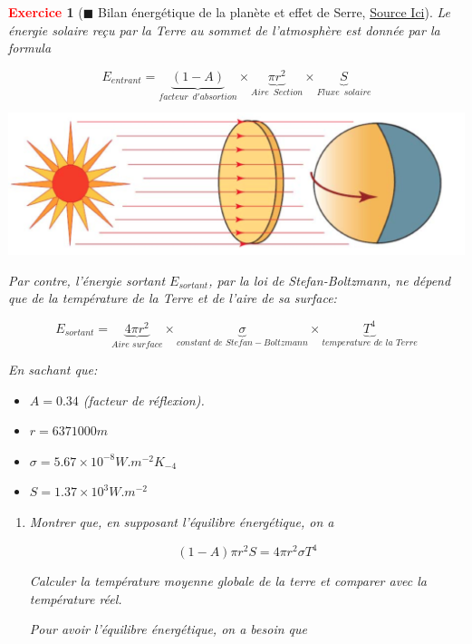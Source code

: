 \documentclass[11pt]{article}
\theoremstyle{mythmstyle}
\newtheorem{exo}{\textcolor{red}{\textbf{Exercice}}}
\begin{document}
\begin{exo}[$\blacksquare$ Bilan énergétique de la planète et effet de Serre, \href{http://step.ipgp.fr/images/e/ec/Bernard_geodynext_td1_corr.pdf}{Source Ici}]
Le énergie solaire reçu  par la Terre au sommet de l'atmosphère est donnée par la formula


$$E_{entrant}= \underbrace{(1-A)}_{facteur \,\,\,d'absortion}\times \underbrace{\pi r^2}_{Aire \,\,\,Section}\times \underbrace{S}_{Fluxe\,\,\, solaire}$$



\begin{center}
    \includegraphics[scale=0.4]{energyin.png}
\end{center}

Par contre, l'énergie sortant $E_{sortant}$, par la loi de Stefan-Boltzmann, ne dépend que de la température de la Terre et de l'aire de sa surface:

$$E_{sortant}= \underbrace{4\pi r^2}_{Aire \,\,surface }\times \underbrace{\sigma}_{constant\,\, de\,\, Stefan-Boltzmann}\times \underbrace{T^4}_{temperature\,\,de\,\,la\,\, Terre}$$

En sachant que:
\begin{itemize}
    \item $A=0.34$ (facteur de réflexion).
    \item $r= 6 371 000 m$
    \item $\sigma=5.67\times 10^{-8} W.m^{-2} K_{-4}$
    \item $S=1.37\times 10^3 W.m^{-2}$
\end{itemize}

\begin{enumerate}
\item Montrer que, en supposant l'équilibre énergétique, on a

$$
(1-A)\pi r^2 S= 4\pi r^2 \sigma T^4
$$

Calculer la température moyenne globale de la terre et comparer avec la température réel.

\begin{solution}
Pour avoir l'équilibre énergétique, on a besoin que


\end{solution}
\end{enumerate}
\end{exo}
\end{document}
